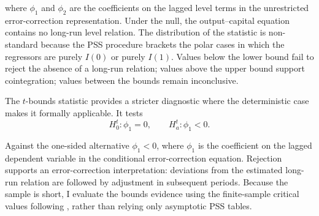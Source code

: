 \documentclass[11pt]{article}
\begin{document}
where $\phi_1$ and $\phi_2$ are the coefficients on the lagged level terms in the unrestricted error-correction representation. Under the null, the output--capital equation contains no long-run level relation. The distribution of the statistic is non-standard because the PSS procedure brackets the polar cases in which the regressors are purely $I(0)$ or purely $I(1)$. Values below the lower bound fail to reject the absence of a long-run relation; values above the upper bound support cointegration; values between the bounds remain inconclusive.

The $t$-bounds statistic provides a stricter diagnostic where the deterministic case makes it formally applicable. It tests
\begin{equation}
H_{0}^{t}: \phi_1=0,
\qquad
H_{a}^{t}: \phi_1<0.
\label{eq:tbounds_hypothesis}
\end{equation}

Against the one-sided alternative $\phi_1<0$, where $\phi_1$ is the coefficient on the lagged dependent variable in the conditional error-correction equation. Rejection supports an error-correction interpretation: deviations from the estimated long-run relation are followed by adjustment in subsequent periods. Because the sample is short, I evaluate the bounds evidence using the finite-sample critical values following \citet{NatsiopoulosTzeremes2022}, rather than relying only asymptotic PSS tables. 

\end{document}
